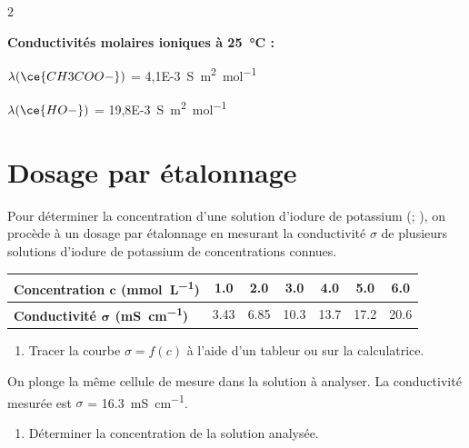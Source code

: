 \documentclass[a4paper,11pt,fleqn]{article}%
\begin{document}
\begin{multicols}{2}
\noindent \colorbox{red!10}{
    \begin{minipage}{.95\linewidth}
    \textbf{Conductivités molaires ioniques à \SI{25}{\celsius} :}
    \begin{itemize**}
        \item $\lambda (\ce{CH3COO-})$ = \SI{4,1E-3}{\siemens\meter\squared\per\mole}
        \item $\lambda (\ce{HO-})$ = \SI{19,8E-3}{\siemens\meter\squared\per\mole}
    \end{itemize**}
    \end{minipage}}

\section{Dosage par étalonnage}
Pour déterminer la concentration d'une solution d'iodure de potassium (; ), on procède à un dosage par étalonnage en mesurant la conductivité $\sigma$ de plusieurs solutions d'iodure de potassium de concentrations connues.
\begin{table}[H]
    \centering \footnotesize
    \begin{tabular}{|>{\centering}m{2cm}|c|c|c|c|c|c|}
        \hline
        \textbf{Concentration $\mathbf{c}$ (\unit{\milli\mole\per\liter})} & \num{1,0}&\num{2,0}&\num{3,0}&\num{4,0}&\num{5,0}&\num{6,0}\\
        \hline
        \textbf{Conductivité $\mathbf{\sigma}$ (\unit{\milli\siemens\per\centi\meter})} & \num{3,43}&\num{6,85}&\num{10,3}&\num{13,7}&\num{17,2}&\num{20,6}\\
        \hline
    \end{tabular}
\end{table}
\begin{enumerate}
    \item Tracer la courbe $\sigma = f(c)$ à l'aide d'un tableur ou sur la calculatrice.
\end{enumerate}
On plonge la même cellule de mesure dans la solution à analyser. La conductivité mesurée est $\sigma$ = \SI{16,3}{\milli\siemens\per\centi\meter}.
\begin{enumerate}[resume]
    \item Déterminer la concentration de la solution analysée.
\end{enumerate}


\end{multicols}
\end{document}
